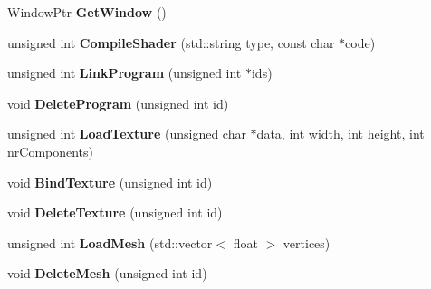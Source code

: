\begin{DoxyCompactItemize}
\mbox{\label{classTarbora_1_1GraphicsEngineImpl_a44ad31f6303619f33315b496c86c1dc6}} 
Window\+Ptr {\bfseries Get\+Window} ()
\item 
\mbox{\label{classTarbora_1_1GraphicsEngineImpl_ae6c57654e7de209fd96b461cd317e31e}} 
unsigned int {\bfseries Compile\+Shader} (std\+::string type, const char $\ast$code)
\item 
\mbox{\label{classTarbora_1_1GraphicsEngineImpl_ae62c4a4806ee3a0ed6de7603f032a5ab}} 
unsigned int {\bfseries Link\+Program} (unsigned int $\ast$ids)
\item 
\mbox{\label{classTarbora_1_1GraphicsEngineImpl_a5cf62fc17bac7b40d285e4a71c3d8448}} 
void {\bfseries Delete\+Program} (unsigned int id)
\item 
\mbox{\label{classTarbora_1_1GraphicsEngineImpl_a89d8e735303e33f3e2f8d3610f496b6d}} 
unsigned int {\bfseries Load\+Texture} (unsigned char $\ast$data, int width, int height, int nr\+Components)
\item 
\mbox{\label{classTarbora_1_1GraphicsEngineImpl_a4185bcc1646d432d5d1bb645c7e9a6f9}} 
void {\bfseries Bind\+Texture} (unsigned int id)
\item 
\mbox{\label{classTarbora_1_1GraphicsEngineImpl_a4d50be41a34070713de06cf55ad3a18c}} 
void {\bfseries Delete\+Texture} (unsigned int id)
\item 
\mbox{\label{classTarbora_1_1GraphicsEngineImpl_a66b0a4dcfe39cdda4b6ac5e7319804e7}} 
unsigned int {\bfseries Load\+Mesh} (std\+::vector$<$ float $>$ vertices)
\item 
\mbox{\label{classTarbora_1_1GraphicsEngineImpl_aade9c84e588f0fb651db238ae640eaae}} 
void {\bfseries Delete\+Mesh} (unsigned int id)
\item 
\mbox{\label{classTarbora_1_1GraphicsEngineImpl_ac710eacee5c718cc3655b2d393163ad4}} 

\end{DoxyCompactItemize}
